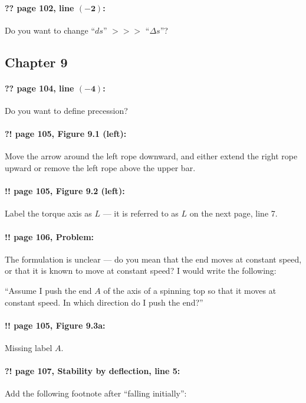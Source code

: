\documentclass[twoside]{article}
\begin{document}
\paragraph{?? page 102, line $\bm{(-2)}$:} Do you want to change “$ds$” $>\!>\!>$ “$\Delta s$”?

\subsection*{Chapter 9}

\paragraph{?? page 104, line $\bm{(-4)}$:} Do you want to define precession?

\paragraph{?! page 105, Figure 9.1 (left):} Move the arrow around the left rope downward,
and either extend the right rope upward or remove the left rope above the upper bar.

\paragraph{!! page 105, Figure 9.2 (left):} Label the torque axis as $L$ — it is referred to as $L$ on the next page, line 7.

\paragraph{!! page 106, Problem:} The formulation is unclear — do you mean that the end moves at constant speed, or that it is known to move at constant speed? I would write the following:

“Assume I push the end $A$ of the axis of a spinning top so that it moves at constant speed. In which direction do I push the end?”

\paragraph{!! page 105, Figure 9.3a:} Missing label $A$.

\paragraph{?! page 107, Stability by deflection, line 5:} Add the following footnote after “falling initially”:
\end{document}
